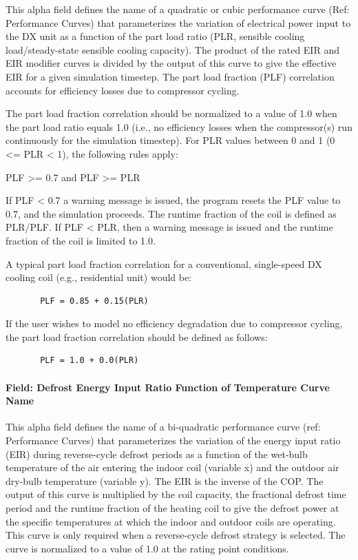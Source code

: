 This alpha field defines the name of a quadratic or cubic performance curve (Ref: Performance Curves) that parameterizes the variation of electrical power input to the DX unit as a function of the part load ratio (PLR, sensible cooling load/steady-state sensible cooling capacity). The product of the rated EIR and EIR modifier curves is divided by the output of this curve to give the effective EIR for a given simulation timestep. The part load fraction (PLF) correlation accounts for efficiency losses due to compressor cycling.

The part load fraction correlation should be normalized to a value of 1.0 when the part load ratio equals 1.0 (i.e., no efficiency losses when the compressor(s) run continuously for the simulation timestep). For PLR values between 0 and 1 (0 \textless{}= PLR \textless{} 1), the following rules apply:

PLF \textgreater{}= 0.7 and PLF \textgreater{}= PLR

If PLF \textless{} 0.7 a warning message is issued, the program resets the PLF value to 0.7, and the simulation proceeds. The runtime fraction of the coil is defined as PLR/PLF. If PLF \textless{} PLR, then a warning message is issued and the runtime fraction of the coil is limited to 1.0.

A typical part load fraction correlation for a conventional, single-speed DX cooling coil (e.g., residential unit) would be:

\begin{lstlisting}
       PLF = 0.85 + 0.15(PLR)
\end{lstlisting}

If the user wishes to model no efficiency degradation due to compressor cycling, the part load fraction correlation should be defined as follows:

\begin{lstlisting}
       PLF = 1.0 + 0.0(PLR)
\end{lstlisting}

\paragraph{Field: Defrost Energy Input Ratio Function of Temperature Curve Name}\label{field-defrost-energy-input-ratio-function-of-temperature-curve-name}

This alpha field defines the name of a bi-quadratic performance curve (ref: Performance Curves) that parameterizes the variation of the energy input ratio (EIR) during reverse-cycle defrost periods as a function of the wet-bulb temperature of the air entering the indoor coil (variable x) and the outdoor air dry-bulb temperature (variable y). The EIR is the inverse of the COP. The output of this curve is multiplied by the coil capacity, the fractional defrost time period and the runtime fraction of the heating coil to give the defrost power at the specific temperatures at which the indoor and outdoor coils are operating. This curve is only required when a reverse-cycle defrost strategy is selected. The curve is normalized to a value of 1.0 at the rating point conditions.

